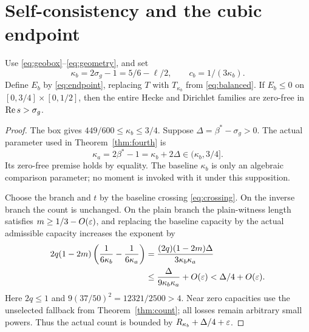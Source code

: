 \section{Self-consistency and the cubic endpoint}\label{sec:cubic}
\begin{theorem}\label{thm:bootstrap}
Use \eqref{eq:geobox}--\eqref{eq:geometry}, and set
\[
 \kappa_b=2\sigma_g-1=5/6-\ell/2,\qquad c_b=1/(3\kappa_b).
\]
Define $E_b$ by \eqref{eq:endpoint}, replacing $T$ with $T_{\kappa_b}$ from \eqref{eq:balanced}. If $E_b\le0$ on $[0,3/4]\times[0,1/2]$, then the entire Hecke and Dirichlet families are zero-free in $\operatorname{Re} s>\sigma_g$.
\end{theorem}
\begin{proof}
The box gives $449/600\le\kappa_b\le3/4$. Suppose $\Delta=\beta^*-\sigma_g>0$. The actual parameter used in Theorem~\ref{thm:fourth} is
\begin{equation}\label{eq:actualkappa}
 \kappa_a=2\beta^*-1=\kappa_b+2\Delta\in(\kappa_b,3/4].
\end{equation}
Its zero-free premise holds by equality. The baseline $\kappa_b$ is only an algebraic comparison parameter; no moment is invoked with it under this supposition.

Choose the branch and $t$ by the baseline crossing \eqref{eq:crossing}. On the inverse branch the count is unchanged. On the plain branch the plain-witness length satisfies $m\ge1/3-O(\varepsilon)$, and replacing the baseline capacity by the actual admissible capacity increases the exponent by
\begin{align}
 2q(1-2m)\left(\frac1{6\kappa_b}-\frac1{6\kappa_a}\right)
 &=\frac{(2q)(1-2m)\Delta}{3\kappa_b\kappa_a}\notag\\
 &\le\frac{\Delta}{9\kappa_b\kappa_a}+O(\varepsilon)
 <\Delta/4+O(\varepsilon).\label{eq:capacitypenalty}
\end{align}
Here $2q\le1$ and $9(37/50)^2=12321/2500>4$. Near zero capacities use the unselected fallback from Theorem~\ref{thm:count}; all losses remain arbitrary small powers. Thus the actual count is bounded by $R_{\kappa_b}+\Delta/4+\varepsilon$.


\end{proof}
